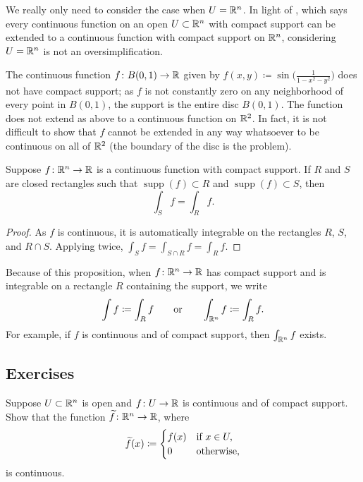 We really only need to consider the case when $U={\mathbb{R}}^n$.  In light of
, which says every continuous
function on an open $U \subset {\mathbb{R}}^n$ with compact support can be extended to a
continuous function with compact support on ${\mathbb{R}}^n$,
considering $U={\mathbb{R}}^n$ is not an oversimplification.

\begin{example}
The continuous function $f \colon B(0,1) \to {\mathbb{R}}$ given by
$f(x,y) \coloneqq \sin\bigl(\frac{1}{1-x^2-y^2}\bigr)$
does not have compact support;
as $f$ is not constantly zero on any neighborhood of every point in $B(0,1)$,
the support is the entire disc $B(0,1)$.  The function 
does not extend as above to a continuous function on ${\mathbb{R}}^2$.  In fact, it is not
difficult to show that $f$ cannot be extended in any way whatsoever to be
continuous on all of ${\mathbb{R}}^2$ (the boundary of the disc is the problem).
\end{example}

\begin{prop} \label{mv:prop:rectanglessupp}
Suppose $f \colon {\mathbb{R}}^n \to {\mathbb{R}}$ is a continuous function with compact support.
If $R$ and $S$ are closed rectangles such that
$\operatorname{supp}(f) \subset R$
and
$\operatorname{supp}(f) \subset S$, then
\begin{equation*}
\int_S f = \int_R f .
\end{equation*}
\end{prop}

\begin{proof}
As $f$ is continuous, it is automatically integrable on the rectangles $R$, $S$, and $R
\cap S$.
Applying  twice,
$\int_S f = \int_{S \cap R} f = \int_R f$.
\end{proof}

Because of this proposition, when $f \colon {\mathbb{R}}^n \to {\mathbb{R}}$ has compact support
and is integrable on a rectangle $R$ containing the support, we write
\begin{equation*}
\int f \coloneqq \int_R f \qquad \text{or} \qquad 
\int_{{\mathbb{R}}^n} f \coloneqq \int_R f .
\end{equation*}
For example, if $f$ is continuous and of compact support, then
$\int_{{\mathbb{R}}^n} f$ exists.

\subsection{Exercises}

\begin{exercise} \label{exercise:contcompactsupportRn}
Suppose $U \subset {\mathbb{R}}^n$ is open and $f \colon U \to {\mathbb{R}}$ is continuous and
of compact support.  Show that the function $\widetilde{f} \colon {\mathbb{R}}^n \to
{\mathbb{R}}$, where
\begin{equation*}
\widetilde{f}(x) \coloneqq
\begin{cases}
f(x) & \text{if } x \in U, \\
0 & \text{otherwise,}
\end{cases}
\avoidbreak
\end{equation*}
is continuous.
\end{exercise}


